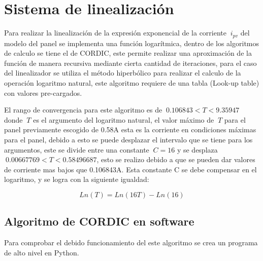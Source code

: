 \chapter{Sistema de linealización}
\label{ch:linealizacion}

Para realizar la linealización de la expresión exponencial de la corriente $\ i_{pv} $ del modelo del panel se implementa una función logarítmica, dentro de los algoritmos de calculo se tiene el de CORDIC, este permite realizar una aproximación de la función de manera recursiva mediante cierta cantidad de iteraciones, para el caso del linealizador se utiliza el método hiperbólico para realizar el calculo de la operación logaritmo natural, este algoritmo requiere de una tabla (Look-up table) con valores pre-cargados. 

El rango de convergencia para este algoritmo es de $\ 0.106843 < T < 9.35947 $ donde $\ T $ es el argumento del logaritmo natural, el valor máximo de $\ T $ para el panel previamente escogido de 0.58A esta es la corriente en condiciones máximas para el panel, debido a esto se puede desplazar el intervalo que se tiene para los argumentos, este se divide entre una constante $\ C = 16$ y se desplaza $\ 0.00667769 < T < 0.58496687 $, esto se realizo debido a que se pueden dar valores de corriente mas bajos que 0.106843A. Esta constante C se debe compensar en el logaritmo, y se logra con la siguiente igualdad: 

\begin{equation} \label{eq:ej1}
  Ln \left( T \right)
  = Ln \left( 16T \right) - Ln\left( 16 \right) 
\end{equation}  

  

\section{Algoritmo de CORDIC en software}
 
Para comprobar el debido funcionamiento del este algoritmo se crea un programa de alto nivel en Python.  


